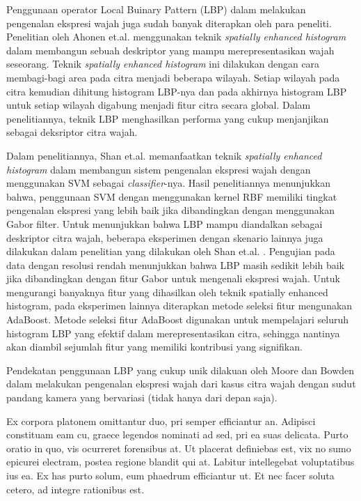 \documentclass[review,3p,12pt]{elsarticle}
\begin{document}
Penggunaan operator Local Buinary Pattern (LBP) dalam melakukan pengenalan ekspresi wajah juga sudah banyak diterapkan oleh para peneliti. Penelitian oleh Ahonen et.al. menggunakan teknik \textit{spatially enhanced histogram} \cite{ahonen2006face} dalam membangun sebuah deskriptor yang mampu merepresentasikan wajah seseorang. Teknik \textit{spatially enhanced histogram} ini dilakukan dengan cara membagi-bagi area pada citra menjadi beberapa wilayah. Setiap wilayah pada citra kemudian dihitung histogram LBP-nya dan pada akhirnya histogram LBP untuk setiap wilayah digabung menjadi fitur citra secara global. Dalam penelitiannya, teknik LBP menghasilkan performa yang cukup menjanjikan sebagai deksriptor citra wajah. 

Dalam penelitiannya, Shan et.al. \cite{shan2009facial} memanfaatkan teknik \textit{spatially enhanced histogram} dalam membangun sistem pengenalan ekspresi wajah dengan menggunakan SVM sebagai \textit{classifier}-nya. Hasil penelitiannya menunjukkan bahwa, penggunaan SVM dengan menggunakan kernel RBF memiliki tingkat pengenalan ekspresi yang lebih baik jika dibandingkan dengan menggunakan Gabor filter. Untuk menunjukkan bahwa LBP mampu diandalkan sebagai deskriptor citra wajah, beberapa eksperimen dengan skenario lainnya juga dilakukan dalam penelitian yang dilakukan oleh Shan et.al. \cite{shan2009facial}. Pengujian pada data dengan resolusi rendah menunjukkan bahwa LBP masih sedikit lebih baik jika dibandingkan dengan fitur Gabor untuk mengenali ekspresi wajah. Untuk mengurangi banyaknya fitur yang dihasilkan oleh teknik spatially enhanced histogram, pada eksperimen lainnya diterapkan metode seleksi fitur mengunakan AdaBoost. Metode seleksi fitur AdaBoost digunakan untuk mempelajari seluruh histogram LBP yang efektif dalam merepresentasikan citra, sehingga nantinya akan diambil sejumlah fitur yang memiliki kontribusi yang signifikan.

Pendekatan penggunaan LBP yang cukup unik dilakuan oleh Moore dan Bowden \cite{moore2011local} dalam melakukan pengenalan ekspresi wajah dari kasus citra wajah dengan sudut pandang kamera yang bervariasi (tidak hanya dari depan saja).

Ex corpora platonem omittantur duo, pri semper efficiantur an. Adipisci constituam eam cu, graece legendos nominati ad sed, pri ea suas delicata. Purto oratio in quo, vis ocurreret forensibus at. Ut placerat definiebas est, vix no sumo epicurei electram, postea regione blandit qui at. Labitur intellegebat voluptatibus ius ea. Ex has purto solum, eum phaedrum efficiantur ut. Et nec facer soluta cetero, ad integre rationibus est.
\end{document}
